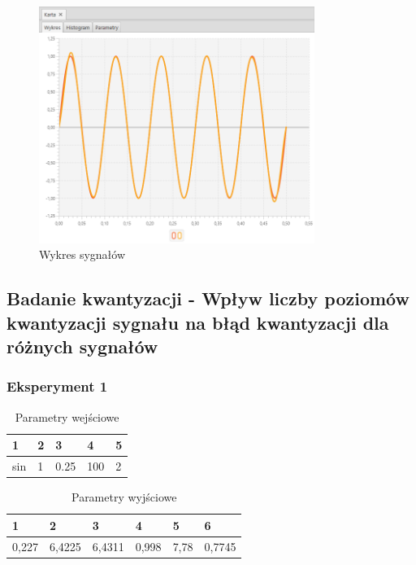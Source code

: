 \documentclass[12pt]{article}
\begin{document}
{{{                \begin{figure}[H]
                    \centering
                    \includegraphics[width=0.8\textwidth]{img/result/experiment4/07/data_draw_original_chart_recon_output_130703.png}
                    \caption{Wykres sygnałów}
                \end{figure}
            }
            \newpage

        }

        \subsection{Badanie kwantyzacji - Wpływ liczby poziomów kwantyzacji sygnału na błąd
        kwantyzacji dla różnych sygnałów} {

            \subsubsection{Eksperyment 1} {
                \begin{table}[H]
                    \centering
                    \begin{tabular}{|l|l|l|l|l|}
                        \hline
                        1 & 2 & 3 & 4 & 5   \\ \hline
                        sin & 1 & 0.25 & 100 & 2      \\ \hline
                    \end{tabular}
                    \caption{Parametry wejściowe}
                \end{table}

                \begin{table}[H]
                    \centering
                    \begin{tabular}{|l|l|l|l|l|l|}
                        \hline
                        1 & 2 & 3 & 4 & 5 & 6  \\ \hline
                        0,227 & 6,4225 & 6,4311 & 0,998 & 7,78 & 0,7745  \\ \hline
                    \end{tabular}
                    \caption{Parametry wyjściowe}
                \end{table}


}}}
\end{document}
